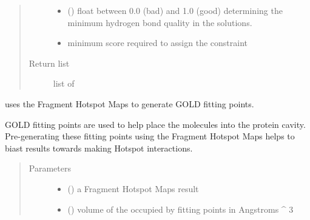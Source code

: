 \documentclass[letterpaper,10pt,english]{sphinxmanual}
\begin{document}
\begin{fulllineitems}
\begin{fulllineitems}
\begin{fulllineitems}
\begin{quote}
\begin{description}
\begin{itemize}
\item {} 
 () \textendash{} float between 0.0 (bad) and 1.0 (good) determining the minimum hydrogen bond quality in the solutions.

\item {} 
 \textendash{} minimum score required to assign the constraint

\end{itemize}

\item[{Return list}] \leavevmode
list of 

\end{description}\end{quote}

\end{fulllineitems}


\end{fulllineitems}


\begin{fulllineitems}
\label{\detokenize{hs_docking_api:hotspots.hs_docking.DockerSettings.add_fitting_points}}
uses the Fragment Hotspot Maps to generate GOLD fitting points.

GOLD fitting points are used to help place the molecules into the protein cavity. Pre-generating these fitting
points using the Fragment Hotspot Maps helps to biast results towards making Hotspot interactions.
\begin{quote}\begin{description}
\item[{Parameters}] \leavevmode\begin{itemize}
\item {} 
 () \textendash{} a Fragment Hotspot Maps result

\item {} 
 () \textendash{} volume of the occupied by fitting points in Angstroms \textasciicircum{} 3


\end{itemize}
\end{description}
\end{quote}
\end{fulllineitems}
\end{fulllineitems}
\end{document}
